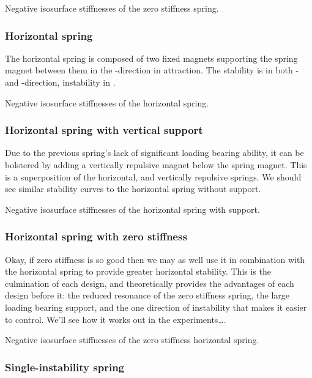 \documentclass[11pt,a4paper]{memoir}
\begin{document}
  {Negative isosurface stiffnesses of the zero stiffness spring.}

\subsubsection{Horizontal spring}

The horizontal spring is composed of two fixed magnets supporting the spring
magnet between them in the \x-direction in attraction. The stability is in
both \y- and \z-direction, instability in \x.

  {Negative isosurface stiffnesses of the horizontal spring.}

\subsubsection{Horizontal spring with vertical support}

Due to the previous spring's lack of significant loading bearing ability, it
can be bolstered by adding a vertically repulsive magnet below the spring
magnet. This is a superposition of the horizontal, and vertically repulsive
springs. We should see similar stability curves to the horizontal spring
without support.

  {Negative isosurface stiffnesses of the horizontal spring with support.}

\subsubsection{Horizontal spring with zero stiffness}

Okay, if zero stiffness is so good then we may as well use it in combination
with the horizontal spring to provide greater horizontal stability. This is
the culmination of each design, and theoretically provides the advantages of
each design before it: the reduced resonance of the zero stiffness spring, the
large loading bearing support, and the one direction of instability that makes
it easier to control. We'll see how it works out in the experiments\dots.

  {Negative isosurface stiffnesses of the zero stiffness horizontal spring.}


\subsubsection{Single-instability spring}
\end{document}
